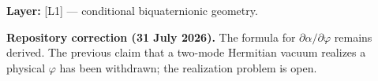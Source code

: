 \noindent\textbf{Layer:} [L1] --- conditional biquaternionic geometry.

\noindent\textbf{Repository correction (31 July 2026).}
The formula for $\partial\alpha/\partial\varphi$ remains derived.  The previous
claim that a two-mode Hermitian vacuum realizes a physical $\varphi$ has been
withdrawn; the realization problem is open.

